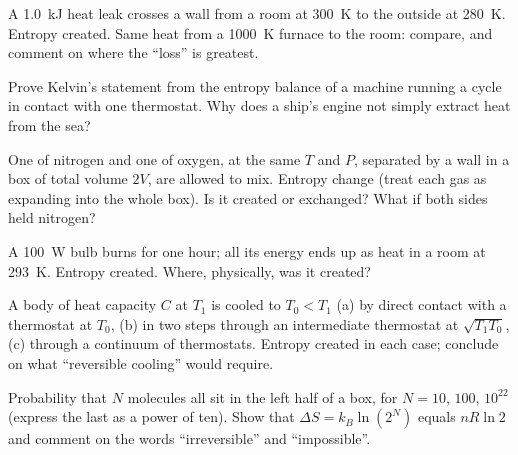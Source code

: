 \begin{exercise}[$\star\star$]\label{exo:b1:second-law-entropy:7}
A \qty{1.0}{kJ} heat leak crosses a wall from a room at \qty{300}{K} to the
outside at \qty{280}{K}. Entropy created. Same heat from a \qty{1000}{K}
furnace to the room: compare, and comment on where the ``loss'' is
greatest.
\end{exercise}

\begin{exercise}[$\star\star$]\label{exo:b1:second-law-entropy:8}
Prove Kelvin's statement from the entropy balance of a machine running
a cycle in contact with one thermostat. Why does a ship's engine not
simply extract heat from the sea?
\end{exercise}

\begin{exercise}[$\star\star$]\label{exo:b1:second-law-entropy:9}
One  of nitrogen and one  of oxygen, at the same $T$ and $P$,
separated by a wall in a box of total volume $2V$, are allowed to mix. Entropy
change (treat each gas as expanding into the whole box). Is it created
or exchanged? What if both sides held nitrogen?
\end{exercise}

\begin{exercise}[$\star\star\star$]\label{exo:b1:second-law-entropy:10}
A \qty{100}{W} bulb burns for one hour; all its energy ends up as heat in
a room at \qty{293}{K}. Entropy created. Where, physically, was it
created?
\end{exercise}

\begin{exercise}[$\star\star\star$]\label{exo:b1:second-law-entropy:11}
A body of heat capacity $C$ at $T_1$ is cooled to $T_0 < T_1$ (a) by
direct contact with a thermostat at $T_0$, (b) in two steps through an
intermediate thermostat at $\sqrt{T_1T_0}$, (c) through a continuum of
thermostats. Entropy created in each case; conclude on what
``reversible cooling'' would require.
\end{exercise}

\begin{exercise}[$\star\star\star$]\label{exo:b1:second-law-entropy:12}
Probability that $N$ molecules all sit in the left half of a box, for
$N = 10$, $100$, $10^{22}$ (express the last as a power of ten). Show that
$\Delta S = k_B\ln(2^N)$ equals $nR\ln2$ and comment on the words
``irreversible'' and ``impossible''.
\end{exercise}

